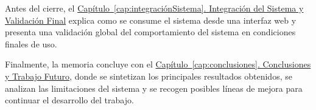 Antes del cierre, el \hyperref[cap:integraciónSistema]{Capítulo~\ref*{cap:integraciónSistema}. Integración del Sistema y Validación Final} explica como se consume el sistema desde una interfaz web y presenta una validación global del comportamiento del sistema en condiciones finales de uso.

Finalmente, la memoria concluye con el \hyperref[cap:conclusiones]{Capítulo~\ref*{cap:conclusiones}. Conclusiones y Trabajo Futuro}, donde se sintetizan los principales resultados obtenidos, se analizan las limitaciones del sistema y se recogen posibles líneas de mejora para continuar el desarrollo del trabajo.


